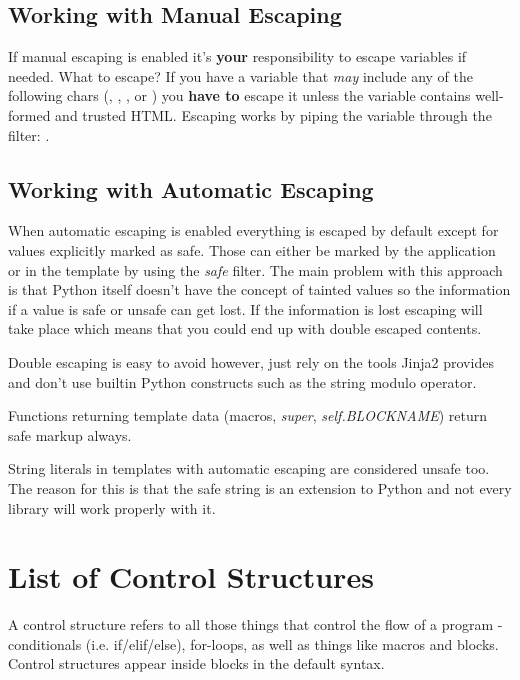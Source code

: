 \documentclass[a4paper,10pt,english]{sphinxmanual}
\begin{document}
\subsection{Working with Manual Escaping}
\label{templates:working-with-manual-escaping}
If manual escaping is enabled it's \textbf{your} responsibility to escape
variables if needed.  What to escape?  If you have a variable that \emph{may}
include any of the following chars (\code{\textgreater{}}, \code{\textless{}}, \code{\&}, or ) you
\textbf{have to} escape it unless the variable contains well-formed and trusted
HTML.  Escaping works by piping the variable through the  filter:
.


\subsection{Working with Automatic Escaping}
\label{templates:working-with-automatic-escaping}
When automatic escaping is enabled everything is escaped by default except
for values explicitly marked as safe.  Those can either be marked by the
application or in the template by using the \emph{\textbar{}safe} filter.  The main
problem with this approach is that Python itself doesn't have the concept
of tainted values so the information if a value is safe or unsafe can get
lost.  If the information is lost escaping will take place which means that
you could end up with double escaped contents.

Double escaping is easy to avoid however, just rely on the tools Jinja2
provides and don't use builtin Python constructs such as the string modulo
operator.

Functions returning template data (macros, \emph{super}, \emph{self.BLOCKNAME}) return
safe markup always.

String literals in templates with automatic escaping are considered unsafe
too.  The reason for this is that the safe string is an extension to Python
and not every library will work properly with it.


\section{List of Control Structures}
\label{templates:list-of-control-structures}
A control structure refers to all those things that control the flow of a
program - conditionals (i.e. if/elif/else), for-loops, as well as things like
macros and blocks.  Control structures appear inside  blocks
in the default syntax.
\end{document}
